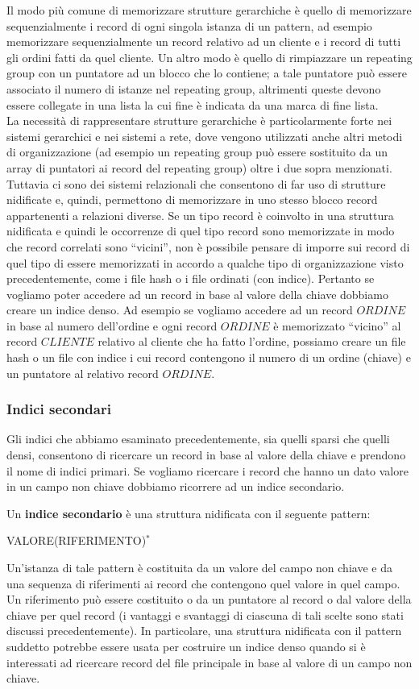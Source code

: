Il modo più comune di memorizzare strutture gerarchiche è quello di memorizzare sequenzialmente
i record di ogni singola istanza di un pattern, ad esempio memorizzare sequenzialmente un record
relativo ad un cliente e i record di tutti gli ordini fatti da quel cliente. Un altro modo è quello di
rimpiazzare un repeating group con un puntatore ad un blocco che lo contiene; a tale puntatore può
essere associato il numero di istanze nel repeating group, altrimenti queste devono essere collegate
in una lista la cui fine è indicata da una marca di fine lista.\\
La necessità di rappresentare strutture gerarchiche è particolarmente forte nei sistemi gerarchici e
nei sistemi a rete, dove vengono utilizzati anche altri metodi di organizzazione (ad esempio un
repeating group può essere sostituito da un array di puntatori ai record del repeating group) oltre i
due sopra menzionati. Tuttavia ci sono dei sistemi relazionali che consentono di far uso di strutture
nidificate e, quindi, permettono di memorizzare in uno stesso blocco record appartenenti a relazioni
diverse.
Se un tipo record è coinvolto in una struttura nidificata e quindi le occorrenze di quel tipo record
sono memorizzate in modo che record correlati sono ``vicini'', non è possibile pensare di imporre sui
record di quel tipo di essere memorizzati in accordo a qualche tipo di organizzazione visto
precedentemente, come i file hash o i file ordinati (con indice). Pertanto se vogliamo poter accedere
ad un record in base al valore della chiave dobbiamo creare un indice denso. Ad esempio se
vogliamo accedere ad un record $ORDINE$ in base al numero dell'ordine e ogni record $ORDINE$ è
memorizzato ``vicino'' al record $CLIENTE$ relativo al cliente che ha fatto l'ordine, possiamo creare
un file hash o un file con indice i cui record contengono il numero di un ordine (chiave) e un
puntatore al relativo record $ORDINE$.

\subsubsection{Indici secondari}
Gli indici che abbiamo esaminato precedentemente, sia quelli sparsi che quelli densi, consentono di
ricercare un record in base al valore della chiave e prendono il nome di indici primari. Se vogliamo
ricercare i record che hanno un dato valore in un campo non chiave dobbiamo ricorrere ad un indice
secondario. 
\begin{defn}
 Un \textbf{indice secondario} è una struttura nidificata con il seguente pattern:
 \begin{center}
VALORE(RIFERIMENTO)$^*$  
 \end{center}
\end{defn}
Un'istanza di tale pattern è costituita da un valore del campo non chiave e da una sequenza di
riferimenti ai record che contengono quel valore in quel campo. Un riferimento può essere costituito
o da un puntatore al record o dal valore della chiave per quel record (i vantaggi e svantaggi di
ciascuna di tali scelte sono stati discussi precedentemente). In particolare, una struttura nidificata
con il pattern suddetto potrebbe essere usata per costruire un indice denso quando si è interessati ad
ricercare record del file principale in base al valore di un campo non chiave.